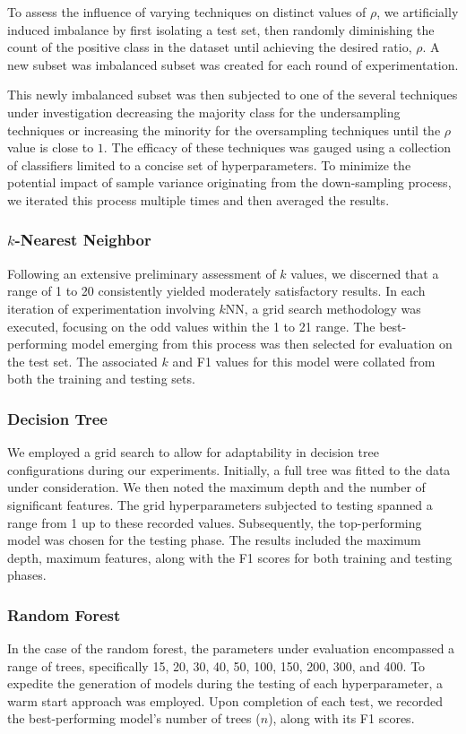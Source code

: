 \documentclass[journal]{IEEEtran}
\begin{document}
	To assess the influence of varying techniques on distinct values of $\rho$, we artificially induced imbalance by
	first isolating a test set, then randomly diminishing the count of the positive class in the dataset 
	until achieving the desired ratio, $\rho$. 
	A new subset was imbalanced subset was created for each round of experimentation.
	
	This newly imbalanced subset was then subjected to one of the several techniques under investigation
	decreasing the majority class for the undersampling techniques or increasing the minority for the oversampling techniques
	until the $\rho$ value is close to $1$.
	The efficacy of these techniques was gauged using a collection of classifiers limited to a concise set of hyperparameters.
	To minimize the potential impact of sample variance originating from the down-sampling process, we iterated this process multiple times and then averaged the results.

	\subsubsection{$k$-Nearest Neighbor}
	Following an extensive preliminary assessment of $k$ values, we discerned that a range of 1 to 20 consistently yielded moderately satisfactory results. In each iteration of experimentation involving $k$NN, a grid search methodology was executed, focusing on the odd values within the 1 to 21 range. The best-performing model emerging from this process was then selected for evaluation on the test set. The associated $k$ and F1 values for this model were collated from both the training and testing sets.

	\subsubsection{Decision Tree}
	We employed a grid search to allow for adaptability in decision tree configurations during our experiments. Initially, a full tree was fitted to the data under consideration. We then noted the maximum depth and the number of significant features. The grid hyperparameters subjected to testing spanned a range from 1 up to these recorded values. Subsequently, the top-performing model was chosen for the testing phase. The results included the maximum depth, maximum features, along with the F1 scores for both training and testing phases.

	\subsubsection{Random Forest}
	In the case of the random forest, the parameters under evaluation encompassed a range of trees, specifically 15, 20, 30, 40, 50, 100, 150, 200, 300, and 400. To expedite the generation of models during the testing of each hyperparameter, a warm start approach was employed. Upon completion of each test, we recorded the best-performing model's number of trees ($n$), along with its F1 scores.
	
\end{document}
